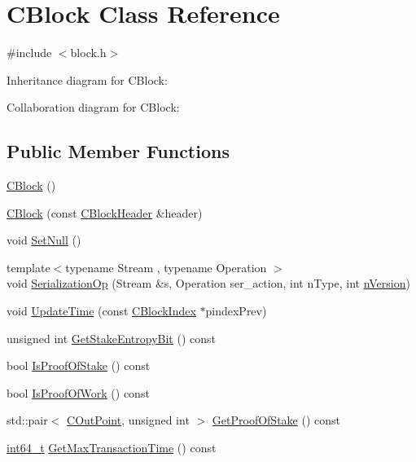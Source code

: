 \hypertarget{class_c_block}{}\section{C\+Block Class Reference}
\label{class_c_block}


{\ttfamily \#include $<$block.\+h$>$}



Inheritance diagram for C\+Block\+:


Collaboration diagram for C\+Block\+:
\subsection*{Public Member Functions}
\begin{DoxyCompactItemize}
\item 
\hyperlink{class_c_block_aaaf8819d785559699cffbbfccb37a3b6}{C\+Block} ()
\item 
\hyperlink{class_c_block_aaeb7e05f86d36f481bbc2802768256bc}{C\+Block} (const \hyperlink{class_c_block_header}{C\+Block\+Header} \&header)
\item 
void \hyperlink{class_c_block_a0410d7ba8d60679c4cf364b82ffffea5}{Set\+Null} ()
\item 
{\footnotesize template$<$typename Stream , typename Operation $>$ }\\void \hyperlink{class_c_block_aa83bbf64300154e8919249f7778f4c17}{Serialization\+Op} (Stream \&s, Operation ser\+\_\+action, int n\+Type, int \hyperlink{class_c_block_header_ad64b7a76914741861f55f0f38ed66fb5}{n\+Version})
\item 
void \hyperlink{class_c_block_a71bb61e73b1ab6b7d4e1867a0d3a2cf8}{Update\+Time} (const \hyperlink{class_c_block_index}{C\+Block\+Index} $\ast$pindex\+Prev)
\item 
unsigned int \hyperlink{class_c_block_aa3e358ffbd3c15aa937fd8a4f8cdf0d7}{Get\+Stake\+Entropy\+Bit} () const 
\item 
bool \hyperlink{class_c_block_a42d001a1eff1d09a76b61a6ff089da35}{Is\+Proof\+Of\+Stake} () const 
\item 
bool \hyperlink{class_c_block_ac6aa1feb7deecb9fffef3978d2745903}{Is\+Proof\+Of\+Work} () const 
\item 
std\+::pair$<$ \hyperlink{class_c_out_point}{C\+Out\+Point}, unsigned int $>$ \hyperlink{class_c_block_aee66480cbb9bc01b5f1d27e6ab71f512}{Get\+Proof\+Of\+Stake} () const 
\item 
\hyperlink{stdint_8h_adec1df1b8b51cb32b77e5b86fff46471}{int64\+\_\+t} \hyperlink{class_c_block_afea5a853e484ab34d8b5fcb9faaf6c49}{Get\+Max\+Transaction\+Time} () const 

\end{DoxyCompactItemize}
